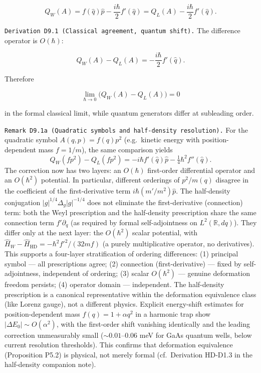 \documentclass[
]{article}
\begin{document}
\[
Q_W(A)
=
f(\hat q)\hat p
-\frac{i\hbar}{2}f'(\hat q)
=
Q_L(A)-\frac{i\hbar}{2}f'(\hat q).
\]

\texttt{Derivation\ D9.1\ (Classical\ agreement,\ quantum\ shift).} The
difference operator is \(O(\hbar)\):

\[
Q_W(A)-Q_L(A)=-\frac{i\hbar}{2}f'(\hat q).
\]

Therefore

\[
\lim_{\hbar\to0}\big(Q_W(A)-Q_L(A)\big)=0
\]

in the formal classical limit, while quantum generators differ at
subleading order.

\texttt{Remark\ D9.1a\ (Quadratic\ symbols\ and\ half-density\ resolution).}
For the quadratic symbol \(A(q,p)=f(q)p^2\) (e.g.~kinetic energy with
position-dependent mass \(f=1/m\)), the same comparison yields \[
Q_W(fp^2)-Q_L(fp^2)=-i\hbar f'(\hat q)\hat p-\tfrac{1}{4}\hbar^2 f''(\hat q).
\] The correction now has two layers: an \(O(\hbar)\) first-order
differential operator and an \(O(\hbar^2)\) potential. In particular,
different orderings of \(p^2/m(q)\) disagree in the coefficient of the
first-derivative term \(i\hbar(m'/m^2)\hat p\). The half-density
conjugation \(|g|^{1/4}\Delta_g|g|^{-1/4}\) does not eliminate the
first-derivative (connection) term: both the Weyl prescription and the
half-density prescription share the same connection term
\(f'\partial_q\) (as required by formal self-adjointness on
\(L^2(\mathbb R,dq)\)). They differ only at the next layer: the
\(O(\hbar^2)\) scalar potential, with
\(\hat H_W-\hat H_{\mathrm{HD}}=-\hbar^2 f'^2/(32mf)\) (a purely
multiplicative operator, no derivatives). This supports a four-layer
stratification of ordering differences: (1) principal symbol --- all
prescriptions agree; (2) connection (first-derivative) --- fixed by
self-adjointness, independent of ordering; (3) scalar \(O(\hbar^2)\) ---
genuine deformation freedom persists; (4) operator domain ---
independent. The half-density prescription is a canonical representative
within the deformation equivalence class (like Lorenz gauge), not a
different physics. Explicit energy-shift estimates for
position-dependent mass \(f(q)=1+\alpha q^2\) in a harmonic trap show
\(|\Delta E_0|\sim O(\alpha^2)\), with the first-order shift vanishing
identically and the leading correction unmeasurably small
(\(\sim 0.01\)--\(0.06\) meV for GaAs quantum wells, below current
resolution thresholds). This confirms that deformation equivalence
(Proposition P5.2) is physical, not merely formal (cf.~Derivation
HD-D1.3 in the half-density companion note).
\end{document}

